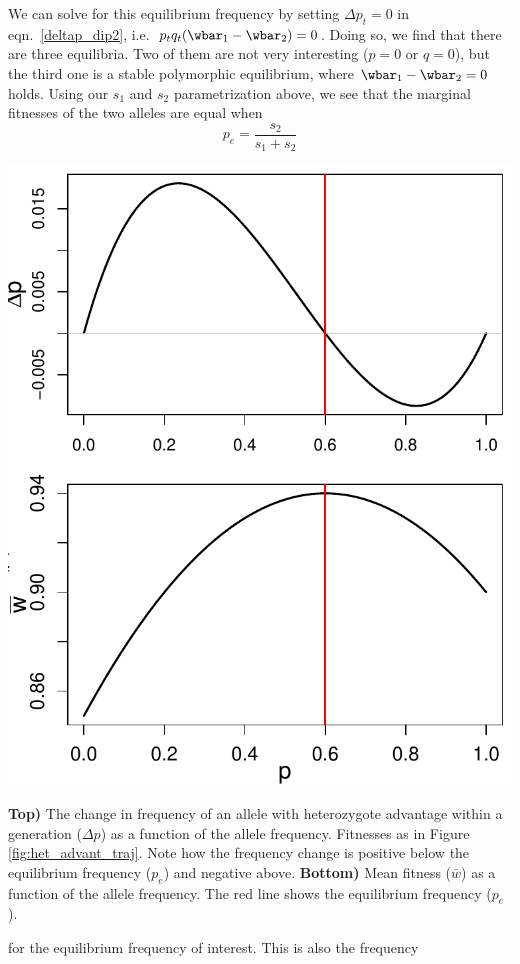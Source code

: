 We can solve for this equilibrium frequency by setting $\Delta p_t = 0$ in  eqn.\ \eqref{deltap_dip2}, 
i.e.\ $p_tq_t (\wbar_1-\wbar_2)=0$. Doing so, we find that there are
three equilibria. Two of them are not very interesting ($p=0$ or
$q=0$), but the third one is a stable polymorphic equilibrium,  where
$\wbar_1-\wbar_2=0$ holds.
Using our $s_1$ and $s_2$ parametrization above, we see that the marginal fitnesses of
the two alleles are equal when
\begin{equation}
	p_e = \frac{s_2}{s_1+s_2} \label{eqn:het_ad_eq}
  \end{equation}
      \begin{marginfigure}
\begin{center}
  \includegraphics[width = \textwidth]{figures/het_advant_dp_wbar.pdf}
\end{center}
\caption{{\bf Top)} The change in frequency of an allele with heterozygote
  advantage within a generation ($\Delta p$) as a function of the allele
frequency. Fitnesses as in Figure \ref{fig:het_advant_traj}. Note how the frequency change is positive below the
equilibrium frequency ($p_e$) and negative above. {\bf Bottom)} Mean
fitness ($\bar{w}$) as a function of the allele frequency. The red line shows
the equilibrium frequency ($p_e$). } \label{fig:het_advant_dp_wbar}
\end{marginfigure} for the equilibrium frequency of interest. This is also the frequency
